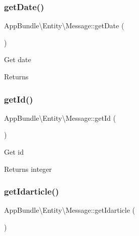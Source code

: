 \subsubsection{\texorpdfstring{get\+Date()}{getDate()}}
{\footnotesize\ttfamily App\+Bundle\textbackslash{}\+Entity\textbackslash{}\+Message\+::get\+Date (\begin{DoxyParamCaption}{ }\end{DoxyParamCaption})}

Get date

\begin{DoxyReturn}{Returns}

\end{DoxyReturn}
\mbox{\label{class_app_bundle_1_1_entity_1_1_message_ae0f01ee025924df768be0e174abb2537}} 
\subsubsection{\texorpdfstring{get\+Id()}{getId()}}
{\footnotesize\ttfamily App\+Bundle\textbackslash{}\+Entity\textbackslash{}\+Message\+::get\+Id (\begin{DoxyParamCaption}{ }\end{DoxyParamCaption})}

Get id

\begin{DoxyReturn}{Returns}
integer 
\end{DoxyReturn}
\mbox{\label{class_app_bundle_1_1_entity_1_1_message_aef5975d1d4eb60e8e503590ec602349e}} 
\subsubsection{\texorpdfstring{get\+Idarticle()}{getIdarticle()}}
{\footnotesize\ttfamily App\+Bundle\textbackslash{}\+Entity\textbackslash{}\+Message\+::get\+Idarticle (\begin{DoxyParamCaption}{ }\end{DoxyParamCaption})}

